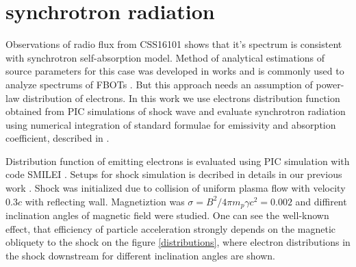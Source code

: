 \documentclass[a4paper,12pt]{extreport}
\begin{document}
\section{synchrotron radiation}\label{synchrotron}
Observations of radio flux from CSS16101 \cite{Coppejans2020} shows that it's spectrum is consistent with synchrotron self-absorption model. Method of analytical estimations of source parameters for this case was developed in works \cite{Chevalier1998, ChevalierFransson} and is commonly used to analyze spectrums of FBOTs \cite{Ho2019cow, Ho2020koala, Coppejans2020, Ho2021at2020}. But this approach needs an assumption of power-law distribution of electrons. In this work we use electrons distribution function obtained from PIC simulations of shock wave and evaluate synchrotron radiation using numerical integration of standard formulae for emissivity and absorption coefficient, described in \cite{Ginzburg1975, Ghisellini}.

Distribution function of emitting electrons is evaluated using PIC simulation with code SMILEI \cite{Derouillat}. Setups for shock simulation is decribed in details in our previous work \cite{BykovUniverse}. Shock was initialized due to collision of uniform plasma flow with velocity $0.3 c$ with reflecting wall. Magnetiztion was $\sigma = B^2/4 \pi m_p \gamma c^2 = 0.002$ and diffirent inclination angles of magnetic field were studied. One can see the well-known effect, that efficiency of particle acceleration strongly depends on the magnetic obliquety to the shock \cite{SironiSpitkovsky2009pair, Crumley2019, GuoSironi2014_1, Romansky2018} on the figure \ref{distributions}, where electron distributions in the shock downstream for different inclination angles are shown.
\end{document}
